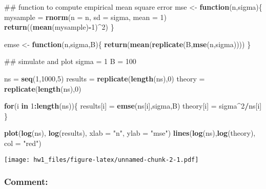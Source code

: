 \documentclass[]{article}
\newenvironment{Shaded}{\begin{snugshade}}{\end{snugshade}}
\newcommand{\KeywordTok}[1]{\textcolor[rgb]{0.13,0.29,0.53}{\textbf{#1}}}
\newcommand{\DataTypeTok}[1]{\textcolor[rgb]{0.13,0.29,0.53}{#1}}
\newcommand{\DecValTok}[1]{\textcolor[rgb]{0.00,0.00,0.81}{#1}}
\newcommand{\StringTok}[1]{\textcolor[rgb]{0.31,0.60,0.02}{#1}}
\newcommand{\ControlFlowTok}[1]{\textcolor[rgb]{0.13,0.29,0.53}{\textbf{#1}}}
\newcommand{\OperatorTok}[1]{\textcolor[rgb]{0.81,0.36,0.00}{\textbf{#1}}}
\newcommand{\NormalTok}[1]{#1}
\begin{document}
\begin{Shaded}
\begin{Highlighting}[]
\NormalTok{## function to compute empirical mean square error }
\NormalTok{mse <-}\StringTok{ }\ControlFlowTok{function}\NormalTok{(n,sigma)\{}
\NormalTok{  mysample =}\StringTok{ }\KeywordTok{rnorm}\NormalTok{(}\DataTypeTok{n =}\NormalTok{ n, }\DataTypeTok{sd =}\NormalTok{ sigma, }\DataTypeTok{mean =} \DecValTok{1}\NormalTok{)}
  \KeywordTok{return}\NormalTok{((}\KeywordTok{mean}\NormalTok{(mysample)}\OperatorTok{-}\DecValTok{1}\NormalTok{)}\OperatorTok{^}\DecValTok{2}\NormalTok{)}
\NormalTok{\}}

\NormalTok{emse <-}\StringTok{ }\ControlFlowTok{function}\NormalTok{(n,sigma,B)\{}
  \KeywordTok{return}\NormalTok{(}\KeywordTok{mean}\NormalTok{(}\KeywordTok{replicate}\NormalTok{(B,}\KeywordTok{mse}\NormalTok{(n,sigma))))}
\NormalTok{\}}

\NormalTok{## simulate and plot}
\NormalTok{sigma =}\StringTok{ }\DecValTok{1}
\NormalTok{B =}\StringTok{ }\DecValTok{100}

\NormalTok{ns =}\StringTok{ }\KeywordTok{seq}\NormalTok{(}\DecValTok{1}\NormalTok{,}\DecValTok{1000}\NormalTok{,}\DecValTok{5}\NormalTok{)}
\NormalTok{results =}\StringTok{ }\KeywordTok{replicate}\NormalTok{(}\KeywordTok{length}\NormalTok{(ns),}\DecValTok{0}\NormalTok{)}
\NormalTok{theory =}\StringTok{ }\KeywordTok{replicate}\NormalTok{(}\KeywordTok{length}\NormalTok{(ns),}\DecValTok{0}\NormalTok{)}

\ControlFlowTok{for}\NormalTok{(i }\ControlFlowTok{in} \DecValTok{1}\OperatorTok{:}\KeywordTok{length}\NormalTok{(ns))\{}
\NormalTok{  results[i] =}\StringTok{ }\KeywordTok{emse}\NormalTok{(ns[i],sigma,B)}
\NormalTok{  theory[i] =}\StringTok{ }\NormalTok{sigma}\OperatorTok{^}\DecValTok{2}\OperatorTok{/}\NormalTok{ns[i]}
\NormalTok{\}}

\KeywordTok{plot}\NormalTok{(}\KeywordTok{log}\NormalTok{(ns), }\KeywordTok{log}\NormalTok{(results), }\DataTypeTok{xlab =} \StringTok{"n"}\NormalTok{, }\DataTypeTok{ylab =} \StringTok{"mse"}\NormalTok{)}
\KeywordTok{lines}\NormalTok{(}\KeywordTok{log}\NormalTok{(ns),}\KeywordTok{log}\NormalTok{(theory), }\DataTypeTok{col =} \StringTok{"red"}\NormalTok{)}
\end{Highlighting}
\end{Shaded}

\texttt{[image: hw1\_files/figure-latex/unnamed-chunk-2-1.pdf]}

\subsubsection{Comment:}\label{comment}
\end{document}
